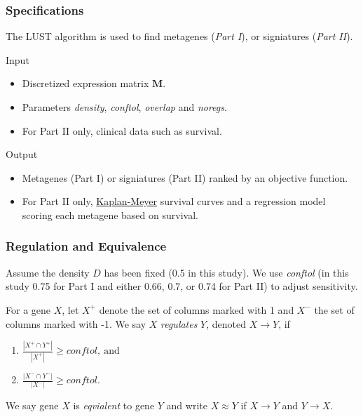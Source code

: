 \documentclass[
	11pt, %
]{beamer}
\begin{document}
\begin{frame}
	\frametitle{Specifications}
	\begin{block}{}
        The LUST algorithm is used to find metagenes (\emph{Part I}), or signiatures (\emph{Part II}).
    \end{block}
    \pause
    \begin{block}{Input}
        \begin{itemize}
            \item Discretized expression matrix $\mathbf{M}$.
            \item Parameters \emph{density}, \emph{conftol}, \emph{overlap} and \emph{noregs}.
            \item For Part II only, clinical data such as survival.
        \end{itemize}
    \end{block}
    \pause
    \begin{block}{Output}
        \begin{itemize}
            \item Metagenes (Part I) or signiatures (Part II) ranked by an objective function.
            \item For Part II only, \href{https://www.mygreatlearning.com/blog/kaplan-meier-curve-explained}{Kaplan-Meyer} survival curves and a regression model scoring each metagene based on survival.
        \end{itemize}
    \end{block}
\end{frame}

\begin{frame}
	\frametitle{Regulation and Equivalence}
    
    Assume the density $D$ has been fixed (0.5 in this study). We use \emph{conftol} (in this study 0.75 for Part I and either 0.66, 0.7, or 0.74 for Part II) to adjust sensitivity.
    
    \bigskip
    \pause
    \begin{definition}
        For a gene $X$, let $X^{+}$ denote the set of columns marked with 1 and $X^{-}$ the set of columns marked with -1. We say $X$ \emph{regulates} $Y$, denoted $X \rightarrow Y$, if
        \begin{enumerate}
            \item $\frac{\left| X^{+} \cap Y^{+} \right|}{\left| X^{+} \right|} \geq conftol,\ \mathrm{and}$
            \item $\frac{\left| X^{-} \cap Y^{-} \right|}{\left| X^{-} \right|} \geq conftol.$
        \end{enumerate}
    \end{definition}
    \pause
    \begin{definition}
        We say gene $X$ is \emph{eqvialent} to gene $Y$ and write $X \approx Y$ if $X \rightarrow Y$ and $Y \rightarrow X$.
    \end{definition}
\end{frame}
\end{document}
